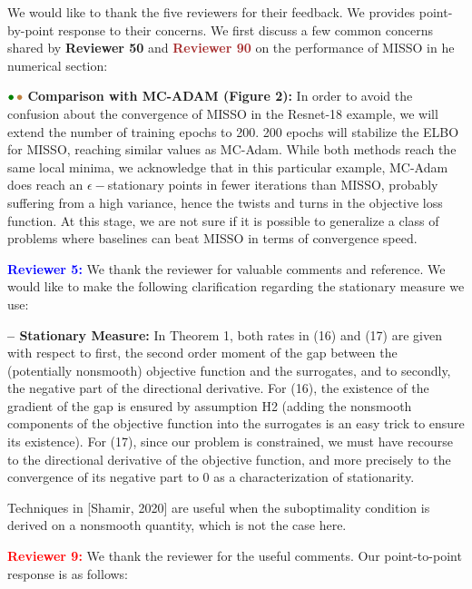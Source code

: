 \documentclass{article}
\begin{document}
We would like to thank the five reviewers for their feedback. We provides point-by-point response to their concerns.
We first discuss a few common concerns shared by \textbf{\textcolor{green!50!black}{Reviewer 50}} and \textbf{\textcolor{brown}{Reviewer 90}} on the performance of MISSO in he numerical section:

\vspace{0.03in}
${\color{green!50!black}\bullet}\!~{\color{brown}\bullet}$ \textbf{Comparison with MC-ADAM (Figure 2):} 
In order to avoid the confusion about the convergence of MISSO in the Resnet-18 example, we will extend the number of training epochs to 200.
200 epochs will stabilize the ELBO for MISSO, reaching similar values as MC-Adam.
While both methods reach the same local minima, we acknowledge that in this particular example, MC-Adam does reach an $\epsilon-$stationary points in fewer iterations than MISSO, probably suffering from a high variance, hence the twists and turns in the objective loss function.
At this stage, we are not sure if it is possible to generalize a class of problems where baselines can beat MISSO in terms of convergence speed.

\medskip
\textbf{\textcolor{blue}{Reviewer 5:}} We thank the reviewer for valuable comments and reference. We would like to make the following clarification regarding the stationary measure we use: 

\vspace{0.03in}
\textbf{-- Stationary Measure:} In Theorem 1, both rates in (16) and (17) are given with respect to first, the second order moment of the gap between the (potentially nonsmooth) objective function and the surrogates, and to secondly, the negative part of the directional derivative.
For (16), the existence of the gradient of the gap is ensured by assumption H2 (adding the nonsmooth components of the objective function into the surrogates is an easy trick to ensure its existence).
For (17), since our problem is constrained, we must have recourse to the directional derivative of the objective function, and more precisely to the convergence of its negative part to $0$ as a characterization of stationarity.

Techniques in [Shamir, 2020] are useful when the suboptimality condition is derived on a nonsmooth quantity, which is not the case here.


\medskip
\textbf{\textcolor{red}{Reviewer 9:}} We thank the reviewer for the useful comments. Our point-to-point response is as follows: 
\end{document}
